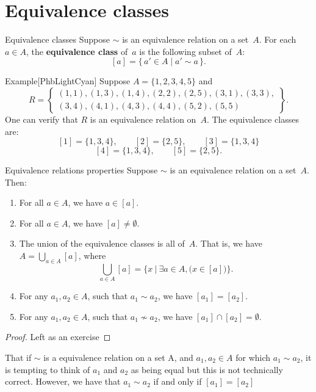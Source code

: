 \documentclass[../MATH-2000-Notes.tex]{subfiles}
\begin{document}
\section{Equivalence classes}
\begin{Definition}
    {Equivalence classes}
    Suppose $\sim$ is an equivalence relation on a set~$A$. For each $a \in A$, the \textbf{equivalence class} of~$a$ is the following subset of~$A$:
    $$ [a] = \{\, a' \in A \mid a' \sim a \,\}
        .$$
\end{Definition}
\begin{commentbox}{Example}[{PhbLightCyan}]\label{EquivClassEg}
    Suppose $A = \{1,2,3,4,5\}$ and
    $$R = \left\{ \begin{matrix} (1,1), (1,3), (1,4), (2,2), (2,5), (3,1), (3,3), \\
            (3,4), (4,1), (4,3), (4,4), (5,2), (5,5)
        \end{matrix}
        \right\} .$$
    One can verify that $R$ is an equivalence relation on~$A$. The equivalence classes are:
    $$ [1] = \{1,3,4\},
        \qquad [2] = \{2,5\} ,
        \qquad [3] = \{1,3,4\}
    $$
    $$[4] = \{1,3,4\} ,
        \qquad [5] = \{2,5\} .$$
\end{commentbox}
\begin{Theorem}
    {Equivalence relations properties}\label{EquivRelProps}
    Suppose $\sim$ is an equivalence relation on a set~$A$. Then:
    \begin{enumerate}
        \item \label{EquivRelProps-aIn[a]}
              For all $a \in A$, we have $a \in [a]$.
        \item \label{EquivRelProps-nonempty}
              For all $a \in A$, we have $[a] \neq \emptyset$.
        \item \label{EquivRelProps-union}
              The union of the equivalence classes is all of~$A$. That is, we have $A = \bigcup_{a \in A} [a]$, where
              $$ \bigcup_{a \in A} [a] = \{ x\ |\ \exists a \in A, \bigl(x \in [a] \bigr)\} .$$
        \item \label{EquivRelProps-equal}
              For any $a_1,a_2 \in A$, such that $a_1 \sim a_2$, we have $[a_1] = [a_2]$.
        \item \label{EquivRelProps-disjoint}
              For any $a_1,a_2 \in A$, such that $a_1 \not\sim a_2$, we have $[a_1] \cap [a_2] = \emptyset$.
    \end{enumerate}
\end{Theorem}
\begin{proof}
    Left as an exercise
\end{proof}
\begin{Note}
    That if \(\sim\) is a equivalence relation on a set A, and \(a_1,a_2 \in A\) for which \(a_1 \sim a_2\), it is tempting to think of \(a_1\) and \(a_2\) as being equal but this is not technically correct. However, we have that \(a_1 \sim a_2\) if and only if \([a_1] = [a_2]\)
\end{Note}
\end{document}
